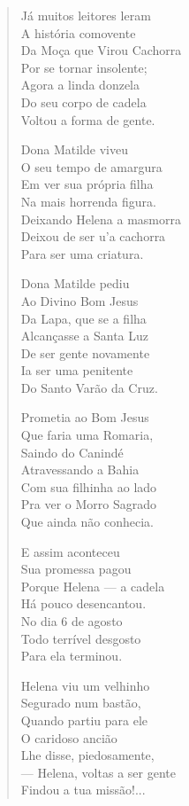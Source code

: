 \begin{verse}
Já muitos leitores leram \\
A história comovente \\
Da Moça que Virou Cachorra \\
Por se tornar insolente; \\
Agora a linda donzela \\
Do seu corpo de cadela \\
Voltou a forma de gente. 

Dona Matilde viveu \\
O seu tempo de amargura \\
Em ver sua própria filha \\
Na mais horrenda figura. \\
Deixando Helena a masmorra \\
Deixou de ser u'a cachorra \\
Para ser uma criatura. 

Dona Matilde pediu \\
Ao Divino Bom Jesus \\
Da Lapa, que se a filha \\
Alcançasse a Santa Luz \\
De ser gente novamente \\
Ia ser uma penitente \\
Do Santo Varão da Cruz. 
\pagebreak

Prometia ao Bom Jesus \\
Que faria uma Romaria, \\
Saindo do Canindé \\
Atravessando a Bahia \\
Com sua filhinha ao lado \\
Pra ver o Morro Sagrado \\
Que ainda não conhecia. 

E assim aconteceu \\
Sua promessa pagou\\
Porque Helena --- a cadela \\
Há pouco desencantou. \\
No dia 6 de agosto \\
Todo terrível desgosto \\
Para ela terminou. 

Helena viu um velhinho \\
Segurado num bastão, \\
Quando partiu para ele \\
O caridoso ancião \\
Lhe disse, piedosamente, \\
--- Helena, voltas a ser gente \\
Findou a tua missão!...


\end{verse}

